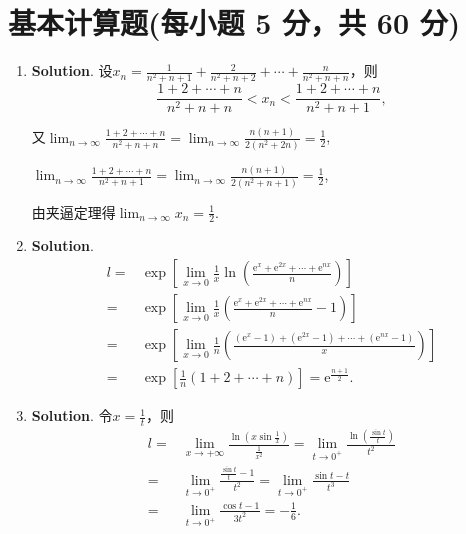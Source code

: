 \documentclass[../Main.tex]{subfiles}
\begin{document}
\section{基本计算题(每小题 5 分，共 60 分)}
\begin{enumerate}
    \item \textbf{Solution}. 设$x_{n}=\frac{1}{n^{2}+n+1}+\frac{2}{n^{2}+n+2}+\cdots
              +\frac{n}{n^{2}+n+n}$，则
          \[
              \frac{1+2+\cdots+n}{n^{2}+n+n}< x_{n} < \frac{1+2+\cdots+n}{n^{2}+n+1},
          \]

          又$\lim_{n\to\infty}\frac{1+2+\cdots+n}{n^{2}+n+n}=\lim_{n\to\infty}\frac{n(n+1)}{2(n^{2}+2n)}
              =\frac{1}{2}$,

          $\lim_{n\to\infty}\frac{1+2+\cdots+n}{n^{2}+n+1}=\lim_{n\to\infty}\frac{n(n+1)}{2(n^{2}+n+1)}
              =\frac{1}{2}$,

          由夹逼定理得$\lim_{n\to\infty}x_{n}=\frac{1}{2}$.

    \item \textbf{Solution}.
          \[
              \begin{aligned}
                  l = & \exp\left[\lim_{x\to0}\frac{1}{x}\ln\left(\frac{\mathrm{e}^x+\mathrm{e}^{2x}+\cdots+\mathrm{e}^{nx}}{n}\right)\right]                                           \\
                  =   & \exp\left[\lim_{x\to0}\frac{1}{x}\left(\frac{\mathrm{e}^x+\mathrm{e}^{2x}+\cdots+\mathrm{e}^{nx}}{n}-1\right)\right]                                            \\
                  =   & \exp\left[\lim_{x\to0}\frac{1}{n}\left(\frac{\left(\mathrm{e}^x-1\right)+\left(\mathrm{e}^{2x}-1\right)+\cdots+\left(\mathrm{e}^{nx}-1\right)}{x}\right)\right] \\
                  =   & \exp\left[\frac{1}{n}(1+2+\cdots+n)\right]=\mathrm{e}^{\frac{n+1}{2}}.
              \end{aligned}
          \]

    \item \textbf{Solution}. 令$x=\frac{1}{t}$，则
          \[
              \begin{aligned}
                  l= & \lim_{x\to+\infty}\frac{\ln\left(x\sin\frac{1}{x}\right)}{\frac{1}{x^2}}= \lim_{t\to0^+}\frac{\ln\left(\frac{\sin t}{t}\right)}{t^2} \\
                  =  & \lim_{t\to0^+}\frac{\frac{\sin t}{t}-1}{t^2}=\lim_{t\to0^+}\frac{\sin t-t}{t^3}                                                      \\
                  =  & \lim_{t\to0^+}\frac{\cos t-1}{3t^2}=-\frac{1}{6}.
              \end{aligned}
          \]


\end{enumerate}
\end{document}
